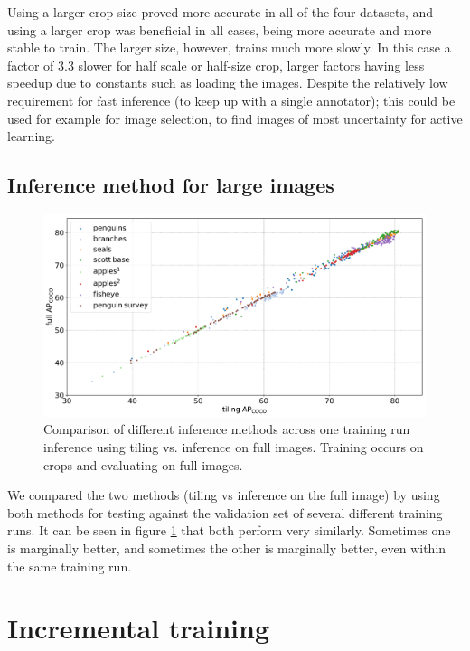 \documentclass[conference]{IEEEtran}
\begin{document}
Using a larger crop size proved more accurate in all of the four datasets, and using a larger crop was beneficial in all cases, being more accurate and more stable to train. The larger size, however, trains much more slowly. In this case a factor of $3.3$ slower for half scale or half-size crop, larger factors having less speedup due to constants such as loading the images. Despite the relatively low requirement for fast inference (to keep up with a single annotator); this could be used for example for image selection, to find images of most uncertainty for active learning.

\subsection {Inference method for large images}

\begin{figure}[htb] 
  \centering
  \includegraphics[width=1.0\linewidth]{figures/splits_scatters.pdf}
  \caption{Comparison of different inference methods across one training run inference using tiling vs. inference on full images. Training occurs on crops and evaluating on full images. }   
  \label{fig:inference_method}
\end{figure}


We compared the two methods (tiling vs inference on the full image) by using both methods for testing against the validation set of several different training runs. It can be seen in figure \ref{fig:inference_method} that both perform very similarly. Sometimes one is marginally better, and sometimes the other is marginally better, even within the same training run.



\section {Incremental training}
\end{document}
